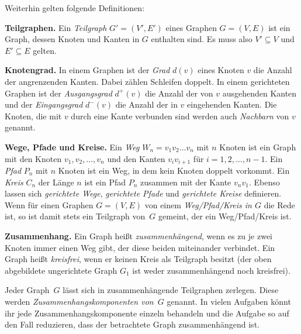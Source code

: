Weiterhin gelten folgende Definitionen:

\textbf{Teilgraphen.} Ein \emph{Teilgraph} $G'=(V',E')$ eines Graphen $G=(V,E)$ ist ein Graph, dessen Knoten und Kanten in $G$ enthalten sind. Es muss also $V' \subseteq V$ und $E'\subseteq E$ gelten.

\textbf{Knotengrad.} In einem Graphen ist der \emph{Grad} $d(v)$ eines Knoten $v$  die Anzahl der angrenzenden Kanten. Dabei zählen Schleifen doppelt. In einem gerichteten Graphen ist der \emph{Ausgangsgrad} $d^+(v)$ die Anzahl der von $v$ ausgehenden Kanten und der \emph{Eingangsgrad} $d^-(v)$ die Anzahl der in $v$ eingehenden Kanten. Die Knoten, die mit $v$ durch eine Kante verbunden sind werden auch \emph{Nachbarn} von $v$ genannt.
	
\textbf{Wege, Pfade und Kreise.} Ein \emph{Weg} $W_n=v_1v_2\ldots v_n$ mit $n$ Knoten ist ein Graph mit den Knoten $v_1,v_2,\dotsc,v_n$ und den Kanten $v_iv_{i+1}$ für $i=1,2,\dotsc,n-1$. Ein \emph{Pfad} $P_n$ mit $n$ Knoten ist ein Weg, in dem kein Knoten doppelt vorkommt. Ein \emph{Kreis} $C_n$ der Länge $n$ ist ein Pfad $P_{n}$ zusammen mit der Kante $v_nv_1$. Ebenso lassen sich \emph{gerichtete Wege}, \emph{gerichtete Pfade} und \emph{gerichtete Kreise} definieren.
Wenn für einen Graphen $G=(V,E)$ von einem \emph{Weg/Pfad/Kreis in $G$} die Rede ist, so ist damit stets ein Teilgraph von~$G$ gemeint, der ein Weg/Pfad/Kreis ist.
	
\textbf{Zusammenhang.} Ein Graph heißt \emph{zusammenhängend}, wenn es zu je zwei Knoten immer einen Weg gibt, der diese beiden miteinander verbindet. Ein Graph heißt \emph{kreisfrei}, wenn er keinen Kreis als Teilgraph besitzt (der oben abgebildete ungerichtete Graph $G_1$ ist weder zusammenhängend noch kreisfrei).

Jeder Graph~$G$ lässt sich in zusammenhängende Teilgraphen zerlegen. Diese werden \emph{Zusammenhangskomponenten von~$G$} genannt. In vielen Aufgaben könnt ihr jede Zusammenhangskomponente einzeln behandeln und die Aufgabe so auf den Fall reduzieren, dass der betrachtete Graph zusammenhängend ist.
	
